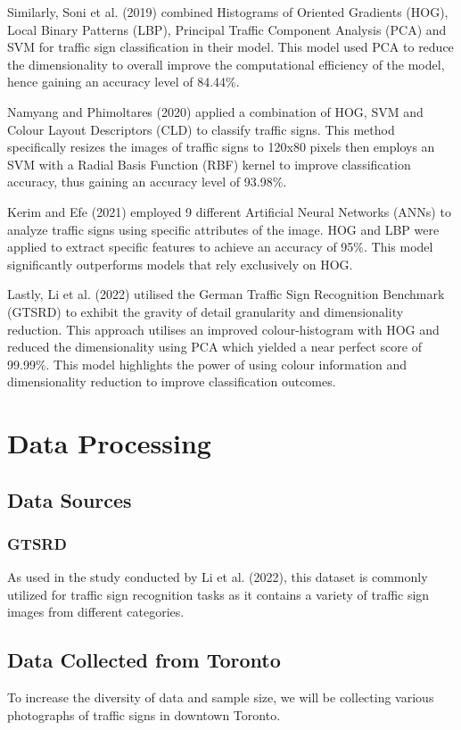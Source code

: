 \documentclass{article} %
\begin{document}
Similarly, Soni et al. (2019) combined Histograms of Oriented Gradients (HOG), Local Binary Patterns (LBP), Principal Traffic Component Analysis (PCA) and SVM for traffic sign classification in their model. This model used PCA to reduce the dimensionality to overall improve the computational efficiency of the model, hence gaining an accuracy level of 84.44\%. 

Namyang and Phimoltares (2020) applied a combination of HOG, SVM and Colour Layout Descriptors (CLD) to classify traffic signs. This method specifically resizes the images of traffic signs to 120x80 pixels then employs an SVM with a Radial Basis Function (RBF) kernel to improve classification accuracy, thus gaining an accuracy level of 93.98\%. 

Kerim and Efe (2021) employed 9 different Artificial Neural Networks (ANNs) to analyze traffic signs using specific attributes of the image. HOG and LBP were applied to extract specific features to achieve an accuracy of 95\%. This model significantly outperforms models that rely exclusively on HOG. 

Lastly, Li et al. (2022) utilised the German Traffic Sign Recognition Benchmark (GTSRD) to exhibit the gravity of detail granularity and dimensionality reduction. This approach utilises an improved colour-histogram with HOG and reduced the dimensionality using PCA which yielded a near perfect score of 99.99\%. This model highlights the power of using colour information and dimensionality reduction to improve classification outcomes. 

\section{Data Processing}
\subsection{Data Sources}
\subsubsection*{GTSRD}
As used in the study conducted by Li et al. (2022), this dataset is commonly utilized for traffic sign recognition tasks as it contains a variety of traffic sign images from different categories.

\subsection*{Data Collected from Toronto}
To increase the diversity of data and sample size, we will be collecting various photographs of traffic signs in downtown Toronto.
\end{document}
